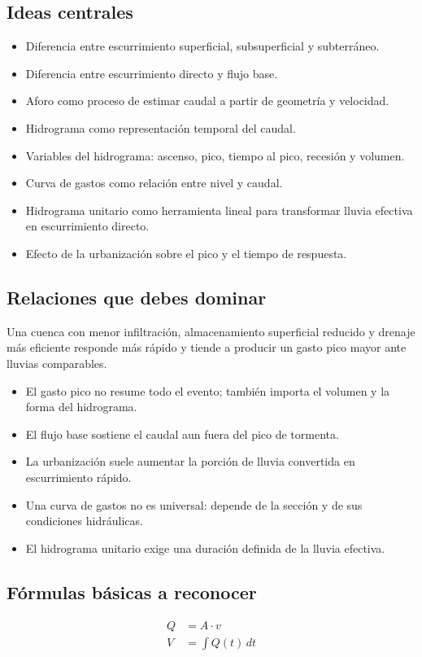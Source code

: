 \documentclass[11pt]{article}
\begin{document}
\subsection{Ideas centrales}
\begin{itemize}
\item Diferencia entre escurrimiento superficial, subsuperficial y subterráneo.
\item Diferencia entre escurrimiento directo y flujo base.
\item Aforo como proceso de estimar caudal a partir de geometría y velocidad.
\item Hidrograma como representación temporal del caudal.
\item Variables del hidrograma: ascenso, pico, tiempo al pico, recesión y volumen.
\item Curva de gastos como relación entre nivel y caudal.
\item Hidrograma unitario como herramienta lineal para transformar lluvia efectiva en escurrimiento directo.
\item Efecto de la urbanización sobre el pico y el tiempo de respuesta.
\end{itemize}

\subsection{Relaciones que debes dominar}
\begin{resultbox}
Una cuenca con menor infiltración, almacenamiento superficial reducido y drenaje más eficiente responde más rápido y tiende a producir un gasto pico mayor ante lluvias comparables.
\end{resultbox}

\begin{itemize}
\item El gasto pico no resume todo el evento; también importa el volumen y la forma del hidrograma.
\item El flujo base sostiene el caudal aun fuera del pico de tormenta.
\item La urbanización suele aumentar la porción de lluvia convertida en escurrimiento rápido.
\item Una curva de gastos no es universal: depende de la sección y de sus condiciones hidráulicas.
\item El hidrograma unitario exige una duración definida de la lluvia efectiva.
\end{itemize}

\subsection{Fórmulas básicas a reconocer}
\begin{align*}
Q &= A \cdot v \\
V &= \int Q(t)\,dt
\end{align*}
\end{document}
